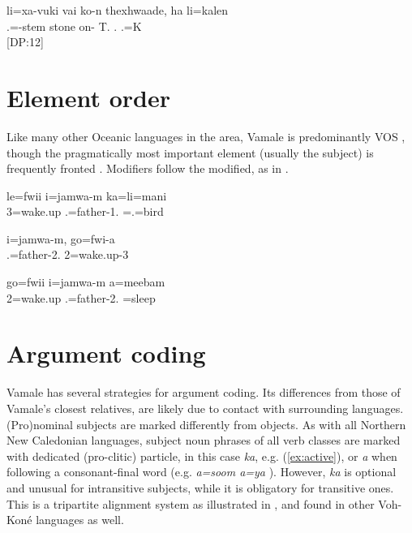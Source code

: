\ea \label{ex:ha}
\gll li=xa-vuki vai ko-n thexhwaade, {\ob}ha{\cb} {\ob}li=kalen{\cb}\\
.=-stem stone on- T. . .=K\\
\glt {} {[DP:12]}
\z


\section{Element order}

Like many other Oceanic languages in the area, Vamale is predominantly VOS , though the pragmatically most important element (usually the subject) is frequently fronted . Modifiers follow the modified, as in .


\ea\label{ex:vos}
\gll le=fwii i=jamwa-m ka=li=mani\\
 3=wake.up .=father-1. =.=bird\\
\glt {}
\z


\ea\label{ex:vos2}
\gll i=jamwa-m, go=fwi-a\\
 .=father-2. 2=wake.up-3\\
\glt {}
\z


\ea \label{ex:vos1}
\gll go=fwii i=jamwa-m a=meebam\\
 2=wake.up .=father-2. =sleep\\
\glt {}
\z
\section{Argument coding}

Vamale has several strategies for argument coding. Its differences from those of Vamale's closest relatives, are likely due to contact with surrounding languages. (Pro)nominal subjects are marked differently from objects. As with all Northern New Caledonian languages, subject noun phrases of all verb classes are marked with dedicated (pro-clitic) particle, in this case \textit{ka}, e.g. (\ref{ex:active}), or \textit{a} when following a consonant-final word (e.g. \textit{a=soom a=ya} ). However, \textit{ka}  is optional and unusual for intransitive subjects, while it is obligatory for transitive ones. This is a tripartite alignment system as illustrated in , and found in other Voh-Koné languages as well. 

